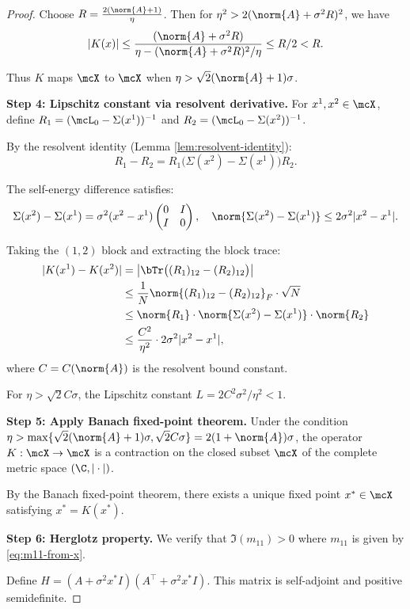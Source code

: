 \begin{proof}
Choose $R = \frac{2(\norm{A} + 1)}{\eta}$. Then for $\eta^2 > 2(\norm{A} + \sigma^2 R)^2$, we have
\[
|K(x)| \leq \frac{(\norm{A} + \sigma^2 R)}{\eta - (\norm{A} + \sigma^2 R)^2/\eta} \leq R/2 < R.
\]

Thus $K$ maps $\mcX$ to $\mcX$ when $\eta > \sqrt{2}(\norm{A} + 1)\sigma$.

\textbf{Step 4: Lipschitz constant via resolvent derivative.}
For $x^1, x^2 \in \mcX$, define $R_1 = (\mcL_0 - \Sigma(x^1))^{-1}$ and $R_2 = (\mcL_0 - \Sigma(x^2))^{-1}$.

By the resolvent identity (Lemma \ref{lem:resolvent-identity}):
\[
R_1 - R_2 = R_1 \bigl(\Sigma(x^2) - \Sigma(x^1)\bigr) R_2.
\]

The self-energy difference satisfies:
\[
\Sigma(x^2) - \Sigma(x^1) = \sigma^2(x^2 - x^1) \begin{pmatrix} 0 & I \\ I & 0 \end{pmatrix},
\quad
\norm{\Sigma(x^2) - \Sigma(x^1)} \leq 2\sigma^2 |x^2 - x^1|.
\]

Taking the $(1,2)$ block and extracting the block trace:
\begin{align}
|K(x^1) - K(x^2)|
&= \bigl|\bTr\bigl((R_1)_{12} - (R_2)_{12}\bigr)\bigr| \notag\\
&\leq \frac{1}{N}\norm{(R_1)_{12} - (R_2)_{12}}_F \cdot \sqrt{N} \notag\\
&\leq \norm{R_1} \cdot \norm{\Sigma(x^2) - \Sigma(x^1)} \cdot \norm{R_2} \notag\\
&\leq \frac{C^2}{\eta^2} \cdot 2\sigma^2 |x^2 - x^1|, \label{eq:lipschitz-K}
\end{align}
where $C = C(\norm{A})$ is the resolvent bound constant.

For $\eta > \sqrt{2}C\sigma$, the Lipschitz constant $L = 2C^2\sigma^2/\eta^2 < 1$.

\textbf{Step 5: Apply Banach fixed-point theorem.}
Under the condition $\eta > \max\{\sqrt{2}(\norm{A} + 1)\sigma, \sqrt{2}C\sigma\} = 2(1 + \norm{A})\sigma$, the operator $K: \mcX \to \mcX$ is a contraction on the closed subset $\mcX$ of the complete metric space $(\C, |\cdot|)$.

By the Banach fixed-point theorem, there exists a unique fixed point $x^* \in \mcX$ satisfying $x^* = K(x^*)$.

\textbf{Step 6: Herglotz property.}
We verify that $\Im(m_{11}) > 0$ where $m_{11}$ is given by \eqref{eq:m11-from-x}.

Define $H = (A + \sigma^2 x^* I)(A^\top + \sigma^2 x^* I)$. This matrix is self-adjoint and positive semidefinite.


\end{proof}
